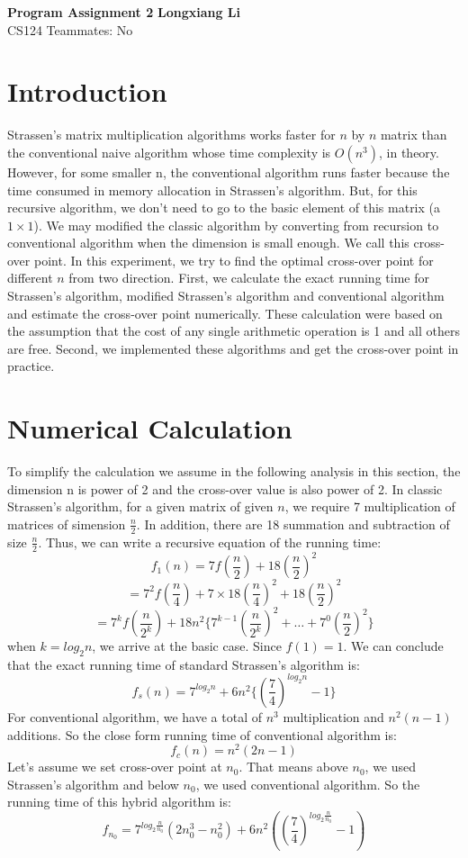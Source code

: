 \documentclass[a4paper, 11pt]{article}
\begin{document}
\noindent
\large\textbf{Program Assignment 2} \hfill \textbf{Longxiang Li} \\
\normalsize CS124 \hfill Teammates: No \\

\section*{Introduction}
Strassen's matrix multiplication algorithms works faster for $n$ by $n$ matrix than the conventional naive algorithm whose time complexity is $O(n^3)$, in theory. However, for some smaller n, the conventional algorithm runs faster because the time consumed in memory allocation in Strassen's algorithm. But, for this recursive algorithm, we don't need to go to the basic element of this matrix (a $1\times1$). We may modified the classic algorithm by converting from recursion to conventional algorithm when the dimension is small enough. We call this cross-over point. In this experiment, we try to find the optimal cross-over point for different $n$ from two direction. First, we calculate the exact running time for Strassen's algorithm, modified Strassen's algorithm and conventional algorithm and estimate the cross-over point numerically. These calculation were based on the assumption that the cost of any single arithmetic operation is 1 and all others are free. Second, we implemented these algorithms and get the cross-over point in practice.
\section*{Numerical Calculation}
To simplify the calculation we assume in the following analysis in this section, the dimension n is power of 2 and the cross-over value is also power of 2. In classic Strassen's algorithm, for a given matrix of given $n$, we require 7 multiplication of matrices of simension $\frac{n}{2}$. In addition, there are 18 summation and subtraction of size $\frac{n}{2}$. Thus, we can write a recursive equation of the running time:
\[{f_1}(n)=7f(\frac{n}{2})+18(\frac{n}{2})^2\] 
\[=7^2f(\frac{n}{4})+7\times18 (\frac{n}{4})^2+18(\frac{n}{2})^2\] 
\[=7^kf(\frac{n}{2^k})+18n^2\{7^{k-1}(\frac{n}{2^k})^2+\dots+7^0(\frac{n}{2})^2\}\]
when $k=log_2{n}$, we arrive at the basic case. Since $f(1)=1$. We can conclude that the exact running time of standard Strassen's algorithm is:
\[f_s(n)=7^{log_2{n}}+6n^2\{(\frac{7}{4})^{log_2{n}}-1\}\]
For conventional algorithm, we have a total of $n^3$ multiplication and $n^2(n-1)$ additions. So the close form running time of conventional algorithm is:
\[f_c(n)=n^2(2n-1)\]
Let's assume we set cross-over point at $n_0$. That means above $n_0$, we used Strassen's algorithm and below $n_0$, we used conventional algorithm. So the running time of this hybrid algorithm is:
\[f_{n_0}=7^{log_2{\frac{n}{n_0}}}(2n_0^3-n_0^2)+6n^2((\frac{7}{4})^{log_2{\frac{n}{n_0}}}-1)\]
\end{document}
